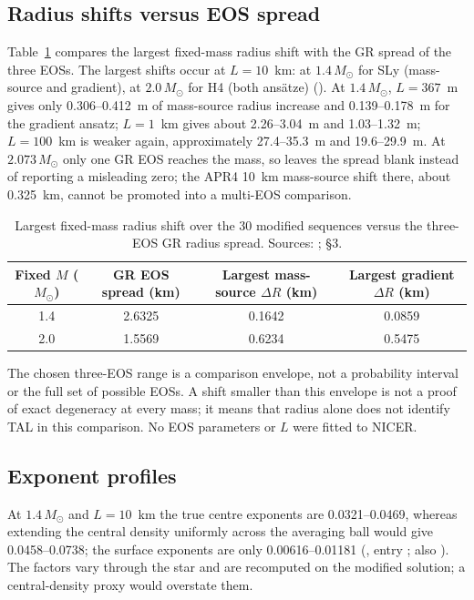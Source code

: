 \documentclass[11pt,a4paper]{article}
\newcommand{\Msun}{M_\odot}
\begin{document}
\subsection{Radius shifts versus EOS spread}
Table~\ref{tab:shift} compares the largest fixed-mass radius shift with the GR spread of the three EOSs. The
largest shifts occur at $L=10$~km: at $1.4\,\Msun$ for SLy (mass-source and gradient), at $2.0\,\Msun$ for H4
(both ans\"atze) (). At $1.4\,\Msun$, $L=367$~m gives only 0.306--0.412~m of
mass-source radius increase and 0.139--0.178~m for the gradient ansatz; $L=1$~km gives about 2.26--3.04~m and
1.03--1.32~m; $L=100$~km is weaker again, approximately 27.4--35.3~m and 19.6--29.9~m. At $2.073\,\Msun$ only
one GR EOS reaches the mass, so  leaves the spread blank instead of reporting a
misleading zero; the APR4 10~km mass-source shift there, about 0.325~km, cannot be promoted into a multi-EOS
comparison.

\begin{table}[t]
\centering
\caption[]{Largest fixed-mass radius shift over the 30 modified sequences versus the three-EOS GR radius
spread. Sources: ;  \S3.}
\label{tab:shift}
\small
\begin{tabular}{cccc}
\toprule
Fixed $M$ ($\Msun$) & GR EOS spread (km) & Largest mass-source $\Delta R$ (km) & Largest gradient $\Delta R$ (km)\\
\midrule
1.4 & 2.6325 & 0.1642 & 0.0859\\
2.0 & 1.5569 & 0.6234 & 0.5475\\
\bottomrule
\end{tabular}
\end{table}

The chosen three-EOS range is a comparison envelope, not a probability interval or the full set of possible
EOSs. A shift smaller than this envelope is not a proof of exact degeneracy at every mass; it means that radius
alone does not identify TAL in this comparison. No EOS parameters or $L$ were fitted to NICER.

\subsection{Exponent profiles}
At $1.4\,\Msun$ and $L=10$~km the true centre exponents are 0.0321--0.0469, whereas extending the central
density uniformly across the averaging ball would give 0.0458--0.0738; the surface exponents are only
0.00616--0.01181 (, entry ; also
). The factors vary through the star and are recomputed on the modified solution;
a central-density proxy would overstate them.
\end{document}
